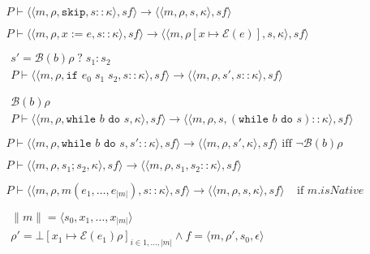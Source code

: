 \documentclass[10pt,notitlepage,twoside]{article}
\newcommand{\eframe}[4]{\langle #1, #2, #3, #4 \rangle}
\newcommand{\state}[2]{\langle #1, #2 \rangle}
\newcommand{\cf}{\mathit{sf}}
\begin{document}
\begin{figure}
\begin{displaymath}
\begin{array}{l}
\hline
\ \\
P \vdash \state{\eframe{m}{\rho}{\texttt{skip}}{s::\kappa}}{\cf}\rightarrow \state{\eframe{m}{\rho}{s}{\kappa}}{\cf} \\
\ \\
P \vdash \state{\eframe{m}{\rho}{x := e}{s::\kappa}}{\cf}\rightarrow \state{\eframe{m}{\rho[x \mapsto \mathcal{E}(e)]}{s}{\kappa}}{\cf} \\
\ \\
\begin{array}{c}
s' = \mathcal{B}(b)\rho \;?\; s_1 : s_2 \\
\hline
P \vdash \state{\eframe{m}{\rho}{\texttt{if }e_0\;s_1\;s_2}{s::\kappa}}{\cf}\rightarrow \state{\eframe{m}{\rho}{s'}{s::\kappa}}{\cf} 
\end{array} \\
\ \\
\begin{array}{c}
\mathcal{B}(b)\rho  \\
\hline
P \vdash \state{\eframe{m}{\rho}{\texttt{while }b\texttt{ do }s}{\kappa}}{\cf}\rightarrow \state{\eframe{m}{\rho}{s}{(\texttt{while }b\texttt{ do }s)::\kappa}}{\cf}
\end{array} \\ 
\ \\
P \vdash \state{\eframe{m}{\rho}{\texttt{while }b\texttt{ do }s}{s' :: \kappa}}{\cf}\rightarrow \state{\eframe{m}{\rho}{s'}{\kappa}}{\cf}  
	\mbox{ iff } \neg \mathcal{B}(b)\rho \\
\ \\
P \vdash \state{\eframe{m}{\rho}{s_1;s_2}{\kappa}}{\cf}\rightarrow \state{\eframe{m}{\rho}{s_1}{s_2 :: \kappa}}{\cf} \\
\ \\
P \vdash \state{\eframe{m}{\rho}{m(e_1,\ldots,e_{|m|})}{s::\kappa}}{\cf}\rightarrow \state{\eframe{m}{\rho}{s}{\kappa}}{\cf}\;\;\;\;\mbox{if } m.\mathit{isNative} \\
\ \\
\begin{array}{c}
\|m\| = \langle s_0,x_1,\ldots,x_{|m|} \rangle \\
 \rho' = \bot[x_1 \mapsto \mathcal{E}(e_1)\rho]_{i \in 1,\ldots,|m|}  \wedge
f = \eframe{m}{\rho'}{s_0}{\epsilon}  \\

\end{array}
\end{array}
\end{displaymath}
\end{figure}
\end{document}
